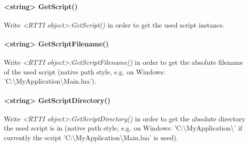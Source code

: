 \paragraph{<string> GetScript()}
Write \emph{<RTTI object>:GetScript()} in order to get the used script instance.

\paragraph{<string> GetScriptFilename()}
Write \emph{<RTTI object>:GetScriptFilename()} in order to get the absolute filename of the used script (native path style, e.g. on Windows: 'C:\textbackslash MyApplication\textbackslash Main.lua').

\paragraph{<string> GetScriptDirectory()}
Write \emph{<RTTI object>:GetScriptDirectory()} in order to get the absolute directory the used script is in (native path style, e.g. on Windows: 'C:\textbackslash MyApplication\textbackslash ' if currently the script 'C:\textbackslash MyApplication\textbackslash Main.lua' is used).
